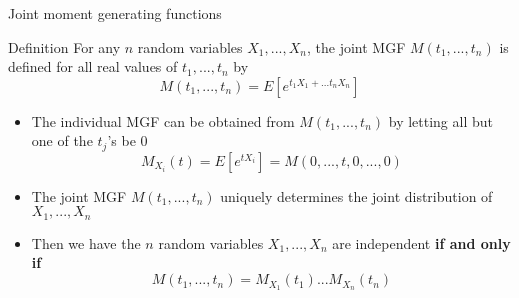 \documentclass[slidestop,compress,mathserif]{beamer}
\begin{document}
\begin{frame}{Joint moment generating functions}
\begin{block}{Definition}
For any $n$ random variables $X_1, ..., X_n$, the joint MGF $M(t_1, ..., t_n)$ is defined for all real values of $t_1, ..., t_n$ by
$$M(t_1, ..., t_n) = E[e^{t_1X_1+...t_nX_n}]$$
\end{block}%

{\small{
\begin{itemize}
\item The individual MGF can be obtained from $M(t_1, ..., t_n)$ by letting all but one of the $t_j$'s be 0
$$M_{X_i}(t) = E[e^{tX_i}] = M(0, ..., t, 0, ..., 0)$$

\item The joint MGF $M(t_1, ..., t_n)$ uniquely determines the joint distribution of $X_1, ..., X_n$

\item Then we have the $n$ random variables $X_1, ..., X_n$ are independent {\bf{if and only if}}
$$M(t_1, ..., t_n) = M_{X_1}(t_1)...M_{X_n}(t_n)$$
\end{itemize}
}}
\end{frame}
%
%
\end{document}
